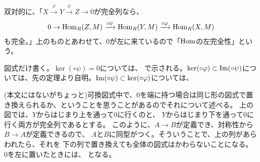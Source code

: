 \documentclass[9pt]{ltjsarticle}
\begin{document}
双対的に、「$X \xrightarrow{\varphi} Y \xrightarrow{\psi}Z \to 0$が完全列なら、
\begin{align}
  0 \to \mathrm{Hom}_R(Z,M) \xrightarrow{\circ \psi} \mathrm{Hom}_R(Y,M) \xrightarrow{\circ \varphi} \mathrm{Hom}_R(X,M)
\end{align}
も完全。」上のものとあわせて、0が左に来ているので「$\mathrm{Hom}$の左完全性」という。
\begin{myproof}
  図式だけ書く。$\ker (\circ \psi)=0$については、
  で示される。$\ker (\circ \varphi)\subset \mathop\mathrm{Im} (\circ \psi)$については、先の定理より自明。$\mathop\mathrm{Im} (\circ \psi) \subset \ker(\circ \varphi)$については、
\end{myproof}

(本文にはないがちょっと)可換図式中で、0を端に持つ場合は同じ形の図式で置き換えられるか、ということを思うことがあるのでそれについて述べる。
上の図では、$Y$からはじまり上を通って$0$に行くのと、
$Y$からはじまり下を通って$0$に行く両方が完全列であるとする。
このように、$A\to B$が定義でき、対称性から$B\to A$が定義できるので、
$A$と$B$に同型がつく。そういうことで、上の列があらわれたら、それを
下の列で置き換えても全体の図式はかわらないことになる。
0を左に置いたときには、
となる。
\end{document}
